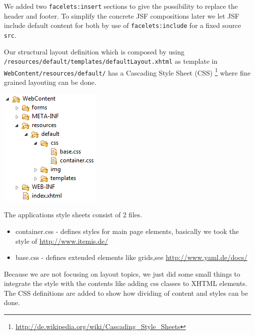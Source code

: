 We added two \texttt{facelets:insert} sections to give the possibility to
replace the header and footer. To simplify the concrete JSF compositions later we let JSF include
default content for both by use of \texttt{facelets:include} for a fixed source
\texttt{src}.

Our structural layout definition which is composed by using
\texttt{/resources/default/templates/defaultLayout.xhtml} as template in \newline
\texttt{WebContent/resources/default/} has a Cascading Style Sheet (CSS)
\footnote{\url{http://de.wikipedia.org/wiki/Cascading_Style_Sheets}} where fine
grained layouting can be done.

\includegraphics{./images/chapter02/css_template.png}

The applications style sheets consist of 2 files.

\begin{itemize}
\item container.css - defines styles for main page elements, basically we took
the style of \url{http://www.itemis.de/}
\item base.css - defines extended elements like grids,see
\url{http://www.yaml.de/docs/}
\end{itemize} 

Because we are not focusing on layout topics, we just did some small things to
integrate the style with the contents like adding css classes to XHTML elements.
The CSS definitions are added to show how dividing of content and styles
can be done.